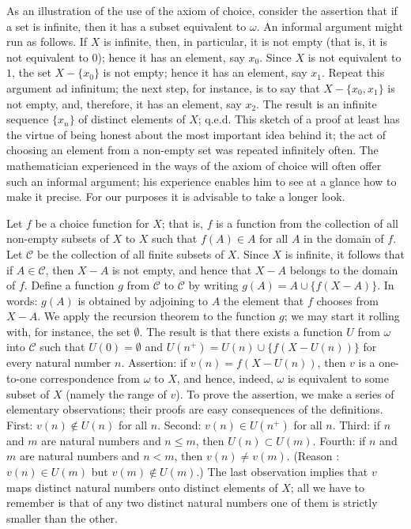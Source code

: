 As an illustration of the use of the axiom of choice, consider the assertion that if a set is infinite, then it has a subset equivalent to $\omega$. An informal argument might run as follows. If $X$ is infinite, then, in particular, it is not empty (that is, it is not equivalent to $0$); hence it has an element, say $x_{0}$. Since $X$ is not equivalent to $1$, the set $X - \{ x_{0} \}$ is not empty; hence it has an element, say $x_{1}$. Repeat this argument ad infinitum; the next step, for instance, is to say that $X - \{ x_{0}, x_{1} \}$ is not empty, and, therefore, it has an element, say $x_{2}$. The result is an infinite sequence $\{ x_{n} \}$ of distinct elements of $X$; q.e.d. This sketch of a proof at least has the virtue of being honest about the most important idea behind it; the act of choosing an element from a non-empty set was repeated infinitely often. The mathematician experienced in the ways of the axiom of choice will often offer such an informal argument; his experience enables him to see at a glance how to make it precise. For our purposes it is advisable to take a longer look.

Let $f$ be a choice function for $X$; that is, $f$ is a function from the collection of all non-empty subsets of $X$ to $X$ such that $f(A) \in A$ for all $A$ in the domain of $f$. Let $\mathcal{C}$ be the collection of all finite subsets of $X$. Since $X$ is infinite, it follows that if $A \in \mathcal{C}$, then $X - A$ is not empty, and hence that $X - A$ belongs to the domain of $f$. Define a function $g$ from $\mathcal{C}$ to $\mathcal{C}$ by writing $g(A) = A \cup \{ f(X - A) \}$. In words: $g(A)$ is obtained by adjoining to $A$ the element that $f$ chooses from $X - A$. We apply the recursion theorem to the function $g$; we may start it rolling with, for instance, the set $ \emptyset $. The result is that there exists a function $U$ from $\omega$ into $\mathcal{C}$ such that $U(0) = \emptyset$ and $U(n^{+}) = U(n) \cup \{ f(X - U(n)) \}$ for every natural number $n$. Assertion: if $v(n) = f(X - U(n))$, then $v$ is a one-to-one correspondence from $\omega$ to $X$, and hence, indeed, $\omega$ is equivalent to some subset of $X$ (namely the range of $v$). To prove the assertion, we make a series  of  elementary observations; their proofs are easy consequences of the definitions. First: $v(n) \notin U(n)$ for all $n$. Second: $v(n) \in U(n^{+})$ for all $n$. Third: if $n$ and $m$ are natural numbers and $n \le m$, then $U(n) \subset U(m)$. Fourth: if $n$ and $m$ are natural numbers and $n < m$, then $v(n) \neq v(m)$.  (Reason : $v(n) \in U(m)$ but $v(m) \notin U(m)$.) The last observation implies that $v$ maps distinct natural numbers onto distinct elements of $X$; all we have to remember is that of any two distinct natural numbers one of them is strictly smaller than the other. 

